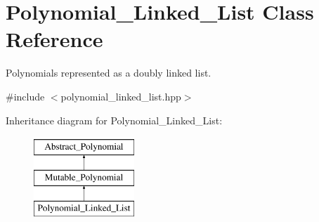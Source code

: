 \hypertarget{class_polynomial___linked___list}{}\section{Polynomial\+\_\+\+Linked\+\_\+\+List Class Reference}
\label{class_polynomial___linked___list}


Polynomials represented as a doubly linked list.  




{\ttfamily \#include $<$polynomial\+\_\+linked\+\_\+list.\+hpp$>$}

Inheritance diagram for Polynomial\+\_\+\+Linked\+\_\+\+List\+:\begin{figure}[H]
\begin{center}
\leavevmode
\includegraphics[height=3.000000cm]{class_polynomial___linked___list}
\end{center}
\end{figure}
